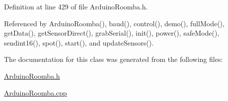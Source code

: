 Definition at line 429 of file ArduinoRoomba.h.



Referenced by ArduinoRoomba(), baud(), control(), demo(), fullMode(), getData(), getSensorDirect(), grabSerial(), init(), power(), safeMode(), sendint16(), spot(), start(), and updateSensors().



The documentation for this class was generated from the following files:\begin{DoxyCompactItemize}
\item 
\hyperlink{_arduino_roomba_8h}{ArduinoRoomba.h}\item 
\hyperlink{_arduino_roomba_8cpp}{ArduinoRoomba.cpp}\end{DoxyCompactItemize}
